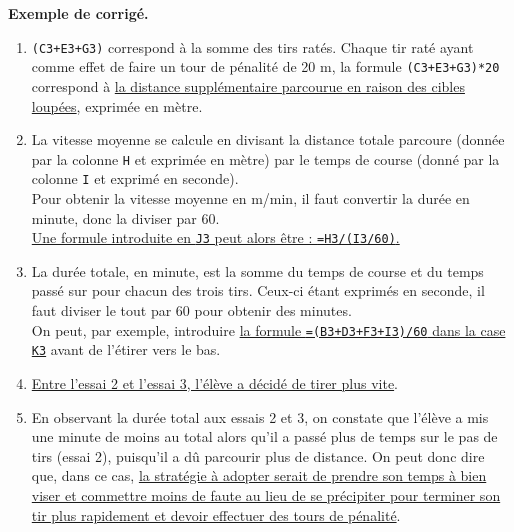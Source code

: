 \begin{activite}
   \textcolor{G1}{
   {\bf Exemple de corrigé.} \smallskip
      \begin{enumerate}
         \item \texttt{(C3+E3+G3)} correspond à la somme des tirs ratés. Chaque tir raté ayant comme effet de faire un tour de pénalité de 20 m, la formule \texttt{(C3+E3+G3)*20} correspond à \uline{la distance supplémentaire parcourue en raison des cibles loupées}, exprimée en mètre.
         \item La vitesse moyenne se calcule en divisant la distance totale parcoure (donnée par la colonne \texttt{H} et exprimée en mètre) par le temps de course (donné par la colonne \texttt{I} et exprimé en seconde). \\
               Pour obtenir la vitesse moyenne en m/min, il faut convertir la durée en minute, donc la diviser par 60. \\
               \uline{Une formule introduite en \texttt{J3} peut alors être : \texttt{=H3/(I3/60)}.}
         \item La durée totale, en minute, est la somme du temps de course et du temps passé sur pour chacun des trois tirs. Ceux-ci étant exprimés en seconde, il faut diviser le tout par 60 pour obtenir des minutes. \\
            On peut, par exemple, introduire \uline{la formule \texttt{=(B3+D3+F3+I3)/60} dans la case \texttt{K3}} avant de l'étirer vers le bas.
         \item \uline{Entre l'essai 2 et l'essai 3, l'élève a décidé de tirer plus vite}.
         \item En observant la durée total aux essais 2 et 3, on constate que l'élève a mis une minute de moins au total alors qu'il a passé plus de temps sur le pas de tirs (essai 2), puisqu'il a dû parcourir plus de distance. On peut donc dire que, dans ce cas, \uline{la stratégie à adopter serait de prendre son temps à bien viser et  commettre moins de faute au lieu de se précipiter pour terminer son tir plus rapidement et devoir effectuer des tours de pénalité}.
      \end{enumerate}}
\end{activite}

\pagebreak


